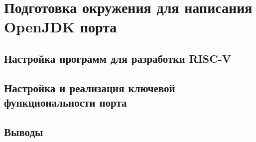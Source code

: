 \section{Подготовка окружения для написания OpenJDK порта}

\subsection{Настройка программ для разработки RISC-V}

\subsection{Настройка и реализация ключевой функциональности порта}

\subsection{Выводы}
